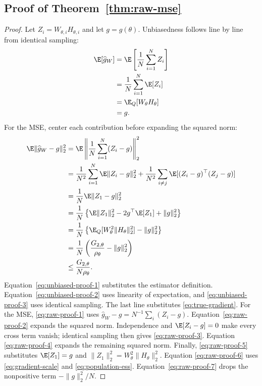 
\subsection{Proof of Theorem~\ref{thm:raw-mse}}

\begin{proof}
Let $Z_i=W_{\theta,i}H_{\theta,i}$ and let $g=g(\theta)$.  Unbiasedness follows
line by line from identical sampling:
\begin{align}
  \E[\widehat g_W]
  &=\E\left[\frac1N\sum_{i=1}^N Z_i\right]
    \label{eq:unbiased-proof-1}\\
  &=\frac1N\sum_{i=1}^N\E[Z_i]
    \label{eq:unbiased-proof-2}\\
  &=\E_Q[W_\theta H_\theta]
    \label{eq:unbiased-proof-3}\\
  &=g.
    \label{eq:unbiased-proof-4}
\end{align}
For the MSE, center each contribution before expanding the squared norm:
\begin{align}
  \E\|\widehat g_W-g\|_2^2
  &=\E\left\|
    \frac1N\sum_{i=1}^N(Z_i-g)
    \right\|_2^2
    \label{eq:raw-proof-1}\\
  &=\frac1{N^2}\sum_{i=1}^N\E\|Z_i-g\|_2^2
    +\frac1{N^2}\sum_{i\ne j}
      \E[(Z_i-g)^\top(Z_j-g)]
    \label{eq:raw-proof-2}\\
  &=\frac1N\E\|Z_1-g\|_2^2
    \label{eq:raw-proof-3}\\
  &=\frac1N\left\{
    \E\|Z_1\|_2^2-2g^\top\E[Z_1]+\|g\|_2^2
    \right\}
    \label{eq:raw-proof-4}\\
  &=\frac1N\left\{
    \E_Q[W_\theta^2\|H_\theta\|_2^2]-\|g\|_2^2
    \right\}
    \label{eq:raw-proof-5}\\
  &=\frac1N\left(
    \frac{G_{2,\theta}}{\rho_\theta}-\|g\|_2^2
    \right)
    \label{eq:raw-proof-6}\\
  &\le\frac{G_{2,\theta}}{N\rho_\theta}.
    \label{eq:raw-proof-7}
\end{align}
Equation~\eqref{eq:unbiased-proof-1} substitutes the estimator definition.
Equation~\eqref{eq:unbiased-proof-2} uses linearity of expectation, and
\eqref{eq:unbiased-proof-3} uses identical sampling.  The last line substitutes
\eqref{eq:true-gradient}.  For the MSE, \eqref{eq:raw-proof-1} uses
$\widehat g_W-g=N^{-1}\sum_i(Z_i-g)$.  Equation~\eqref{eq:raw-proof-2} expands
the squared norm.  Independence and $\E[Z_i-g]=0$ make every cross term vanish;
identical sampling then gives \eqref{eq:raw-proof-3}.  Equation
\eqref{eq:raw-proof-4} expands the remaining squared norm.  Finally,
\eqref{eq:raw-proof-5} substitutes $\E[Z_1]=g$ and
$\|Z_1\|_2^2=W_\theta^2\|H_\theta\|_2^2$.  Equation
\eqref{eq:raw-proof-6} uses \eqref{eq:gradient-scale} and
\eqref{eq:population-ess}.  Equation~\eqref{eq:raw-proof-7} drops the
nonpositive term $-\|g\|_2^2/N$.
\end{proof}

